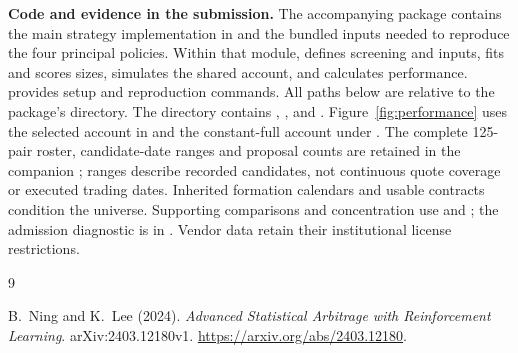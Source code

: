 \documentclass[11pt,letterpaper]{article}
\begin{document}
{\raggedright
\textbf{Code and evidence in the submission.} The accompanying package contains
the main strategy implementation in  and the bundled inputs
needed to reproduce the four principal policies. Within that module,
 defines screening and inputs,  fits and scores
sizes,  simulates the shared account, and 
calculates performance.  provides setup and reproduction commands.
All paths below are relative to the package's  directory.
The directory  contains
, ,  and
. Figure~\ref{fig:performance} uses the selected account in
 and the constant-full account
under .
The complete 125-pair roster, candidate-date ranges and proposal counts are
retained in the companion ; ranges describe
recorded candidates, not continuous quote coverage or executed trading dates.
Inherited formation calendars and usable contracts condition the universe.
Supporting comparisons and concentration use 
and ; the admission diagnostic is in
.
Vendor data retain their institutional license restrictions.\par}

\begin{thebibliography}{9}
\raggedright
{} B.~Ning and K.~Lee (2024).
\emph{Advanced Statistical Arbitrage with Reinforcement Learning}.
arXiv:2403.12180v1. \url{https://arxiv.org/abs/2403.12180}.
\end{thebibliography}
\end{document}
